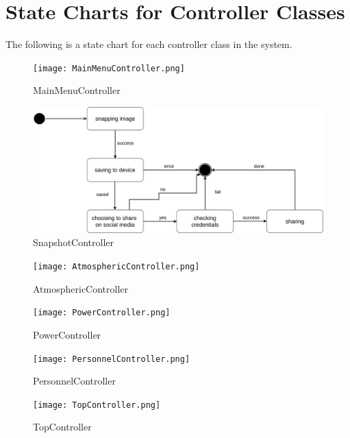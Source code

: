\documentclass[]{article}
\begin{document}
\section{State Charts for Controller Classes}
\label{sec:state_charts_for_controller_classes}

The following is a state chart for each controller class in the system.

\begin{figure}[H]
	\centering
	\texttt{[image: MainMenuController.png]}
	\caption{MainMenuController}
\end{figure}
\begin{figure}[H]
	\centering
	\includegraphics[width=150mm]{SnapshotController.png}
	\caption{SnapshotController}
\end{figure}
\begin{figure}[H]
	\centering
	\texttt{[image: AtmosphericController.png]}
	\caption{AtmosphericController}
\end{figure}
\begin{figure}[H]
	\centering
	\texttt{[image: PowerController.png]}
	\caption{PowerController}
\end{figure}
\begin{figure}[H]
	\centering
	\texttt{[image: PersonnelController.png]}
	\caption{PersonnelController}
\end{figure}
\begin{figure}[H]
	\centering
	\texttt{[image: TopController.png]}
	\caption{TopController}
\end{figure}
\end{document}
